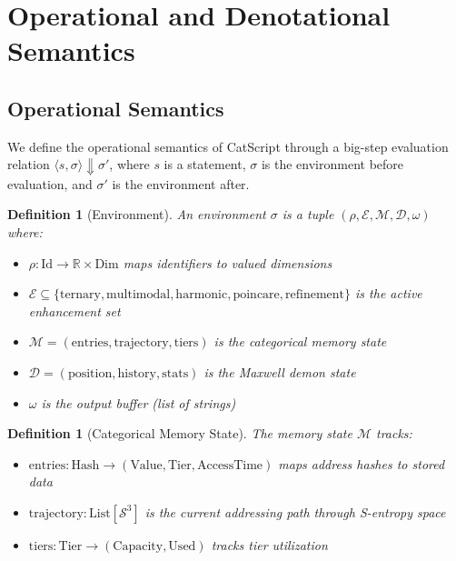 \documentclass[twocolumn,10pt]{article}
\newtheorem{definition}[theorem]{Definition}
\begin{document}
\section{Operational and Denotational Semantics}
\label{sec:semantics}

\subsection{Operational Semantics}

We define the operational semantics of CatScript \cite{winskel1993semantics} through a big-step evaluation relation $\langle s, \sigma \rangle \Downarrow \sigma'$, where $s$ is a statement, $\sigma$ is the environment before evaluation, and $\sigma'$ is the environment after.

\begin{definition}[Environment]
An environment $\sigma$ is a tuple $(\rho, \mathcal{E}, \mathcal{M}, \mathcal{D}, \omega)$ where:
\begin{itemize}
    \item $\rho : \text{Id} \to \mathbb{R} \times \text{Dim}$ maps identifiers to valued dimensions
    \item $\mathcal{E} \subseteq \{\text{ternary}, \text{multimodal}, \text{harmonic}, \text{poincare}, \text{refinement}\}$ is the active enhancement set
    \item $\mathcal{M} = (\text{entries}, \text{trajectory}, \text{tiers})$ is the categorical memory state
    \item $\mathcal{D} = (\text{position}, \text{history}, \text{stats})$ is the Maxwell demon state
    \item $\omega$ is the output buffer (list of strings)
\end{itemize}
\end{definition}

\begin{definition}[Categorical Memory State]
The memory state $\mathcal{M}$ tracks:
\begin{itemize}
    \item $\text{entries} : \text{Hash} \to (\text{Value}, \text{Tier}, \text{AccessTime})$ maps address hashes to stored data
    \item $\text{trajectory} : \text{List}[\mathcal{S}^3]$ is the current addressing path through S-entropy space
    \item $\text{tiers} : \text{Tier} \to (\text{Capacity}, \text{Used})$ tracks tier utilization
\end{itemize}
\end{definition}
\end{document}
